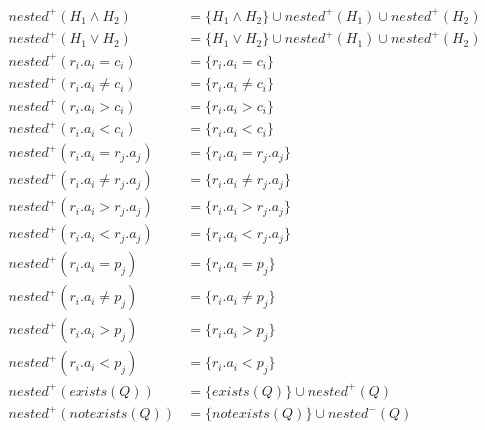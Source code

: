 \begin{mydef}
	
	\begin{align*}
		nested^+(H_1\land H_2) & = \{H_1 \land H_2\}  \cup nested^+(H_1) \cup nested^+(H_2) \\
		nested^+(H_1\lor H_2) & = \{H_1 \lor H_2\}  \cup nested^+(H_1) \cup nested^+(H_2) \\
		nested^+(r_i.a_i = c_i) & = \{r_i.a_i = c_i\} \\
		nested^+(r_i.a_i \neq c_i) & = \{r_i.a_i \neq c_i\} \\
		nested^+(r_i.a_i > c_i) & = \{r_i.a_i > c_i\} \\
		nested^+(r_i.a_i < c_i) & = \{r_i.a_i < c_i\} \\
		nested^+(r_i.a_i = r_j.a_j) & = \{r_i.a_i = r_j.a_j\} \\
		nested^+(r_i.a_i \neq r_j.a_j) & = \{r_i.a_i \neq r_j.a_j\} \\
		nested^+(r_i.a_i > r_j.a_j) & = \{r_i.a_i > r_j.a_j\} \\
		nested^+(r_i.a_i < r_j.a_j) & = \{r_i.a_i < r_j.a_j\} \\
		nested^+(r_i.a_i = p_j) & = \{r_i.a_i = p_j\} \\
		nested^+(r_i.a_i \neq p_j) & = \{r_i.a_i \neq p_j\} \\
		nested^+(r_i.a_i > p_j) & = \{r_i.a_i > p_j\} \\
		nested^+(r_i.a_i < p_j) & = \{r_i.a_i < p_j\} \\
		nested^+(exists(Q)) & = \{exists(Q)\} \cup nested^+(Q) \\
		nested^+(notexists(Q)) & = \{notexists(Q)\} \cup nested^-(Q) \\
	\end{align*}
	

\end{mydef}
